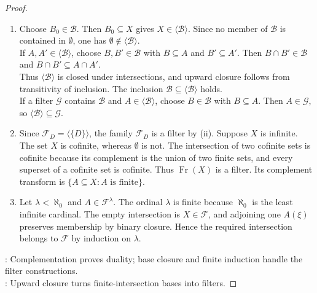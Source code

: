 \begin{proposition}
\begin{proof}
\begin{enumerate}[label=(\roman*)]
Let $A\in\mathcal{I}$ and $X\setminus A\subseteq E\subseteq X$. Then $X\setminus E\subseteq A$, so $X\setminus E\in\mathcal{I}$ and $E\in\mathcal{F}_{\mathcal{I}}$. Hence $\mathcal{F}_{\mathcal{I}}$ is a filter.
\item Choose $B_0\in\mathcal{B}$. Then $B_0\subseteq X$ gives $X\in\langle\mathcal{B}\rangle$. Since no member of $\mathcal{B}$ is contained in $\emptyset$, one has $\emptyset\notin\langle\mathcal{B}\rangle$.\\
If $A,A'\in\langle\mathcal{B}\rangle$, choose $B,B'\in\mathcal{B}$ with $B\subseteq A$ and $B'\subseteq A'$. Then $B\cap B'\in\mathcal{B}$ and $B\cap B'\subseteq A\cap A'$.\\
Thus $\langle\mathcal{B}\rangle$ is closed under intersections, and upward closure follows from transitivity of inclusion. The inclusion $\mathcal{B}\subseteq\langle\mathcal{B}\rangle$ holds.\\
If a filter $\mathcal{G}$ contains $\mathcal{B}$ and $A\in\langle\mathcal{B}\rangle$, choose $B\in\mathcal{B}$ with $B\subseteq A$. Then $A\in\mathcal{G}$, so $\langle\mathcal{B}\rangle\subseteq\mathcal{G}$.
\item Since $\mathcal{F}_D=\langle\{D\}\rangle$, the family $\mathcal{F}_D$ is a filter by (ii). Suppose $X$ is infinite. The set $X$ is cofinite, whereas $\emptyset$ is not. The intersection of two cofinite sets is cofinite because its complement is the union of two finite sets, and every superset of a cofinite set is cofinite. Thus $\operatorname{Fr}(X)$ is a filter. Its complement transform is $\{A\subseteq X:A\text{ is finite}\}$.
\item Let $\lambda<\aleph_0$ and $A\in\mathcal{F}^{\lambda}$. The ordinal $\lambda$ is finite because $\aleph_0$ is the least infinite cardinal. The empty intersection is $X\in\mathcal{F}$, and adjoining one $A(\xi)$ preserves membership by binary closure. Hence the required intersection belongs to $\mathcal{F}$ by induction on $\lambda$.
\end{enumerate}
: Complementation proves duality; base closure and finite induction handle the filter constructions.\\
: Upward closure turns finite-intersection bases into filters.
\end{proof}
\end{proposition}

